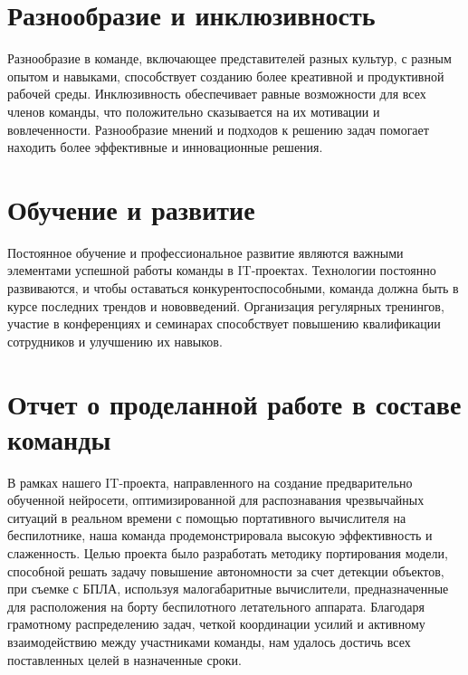     \section{Разнообразие и инклюзивность}
    Разнообразие в команде, включающее представителей разных культур, с разным опытом и навыками, способствует созданию более креативной и продуктивной рабочей среды. Инклюзивность обеспечивает равные возможности для всех членов команды, что положительно сказывается на их мотивации и вовлеченности. Разнообразие мнений и подходов к решению задач помогает находить более эффективные и инновационные решения.

    \section{Обучение и развитие}
    Постоянное обучение и профессиональное развитие являются важными элементами успешной работы команды в IT-проектах. Технологии постоянно развиваются, и чтобы оставаться конкурентоспособными, команда должна быть в курсе последних трендов и нововведений. Организация регулярных тренингов, участие в конференциях и семинарах способствует повышению квалификации сотрудников и улучшению их навыков.

    \section{Отчет о проделанной работе в составе команды}
    В рамках нашего IT-проекта, направленного на создание предварительно обученной нейросети, оптимизированной для распознавания чрезвычайных ситуаций в реальном времени с помощью портативного вычислителя на беспилотнике, наша команда продемонстрировала высокую эффективность и слаженность. Целью проекта было разработать методику портирования модели, способной решать задачу повышение автономности за счет детекции объектов, при съемке с БПЛА, используя малогабаритные вычислители, предназначенные для расположения на борту беспилотного летательного аппарата. Благодаря грамотному распределению задач, четкой координации усилий и активному взаимодействию между участниками команды, нам удалось достичь всех поставленных целей в назначенные сроки.

